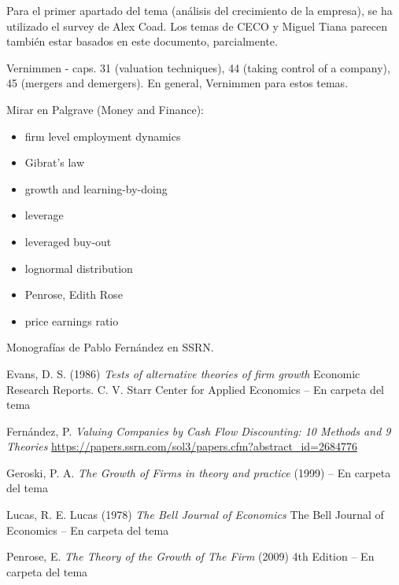 \documentclass{nuevotema}
\begin{document}
\bibliografia

Para el primer apartado del tema (análisis del crecimiento de la empresa), se ha utilizado el survey de Alex Coad. Los temas de CECO y Miguel Tiana parecen también estar basados en este documento, parcialmente.

Vernimmen - caps. 31 (valuation techniques), 44 (taking control of a company), 45 (mergers and demergers). En general, Vernimmen para estos temas.

Mirar en Palgrave (Money and Finance):
\begin{itemize}
	\item firm level employment dynamics
	\item Gibrat's law
	\item growth and learning-by-doing
    \item leverage
    \item leveraged buy-out
    \item lognormal distribution
    \item Penrose, Edith Rose
    \item price earnings ratio
\end{itemize}

Monografías de Pablo Fernández en SSRN.

Evans, D. S. (1986) \textit{Tests of alternative theories of firm growth} Economic Research Reports. C. V. Starr Center for Applied Economics -- En carpeta del tema

Fernández, P. \textit{Valuing Companies by Cash Flow Discounting: 10 Methods and 9 Theories } \url{https://papers.ssrn.com/sol3/papers.cfm?abstract\_id=2684776}

Geroski, P. A. \textit{The Growth of Firms in theory and practice} (1999) -- En carpeta del tema

Lucas, R. E. Lucas (1978) \textit{The Bell Journal of Economics} The Bell Journal of Economics -- En carpeta del tema

Penrose, E. \textit{The Theory of the Growth of The Firm} (2009) 4th Edition -- En carpeta del tema
\end{document}
